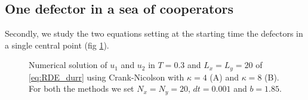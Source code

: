 \subsection{One defector in a sea of cooperators}

Secondly, we study the two equations setting at the starting time
the defectors in a single central point (fig \ref{fig:onedef-2}). 

\begin{figure}

\caption{\label{fig:onedef-2}Numerical solution of $u_{1}$ and $u_{2}$ in
$T=0.3$ and $L_{x}=L_{y}=20$ of \ref{eq:RDE_durr} using Crank-Nicolson
with $\kappa=4$ (A) and $\kappa=8$ (B). For both the methods we
set $N_{x}=N_{y}=20$, $dt=0.001$ and $b=1.85$.}
\end{figure}


